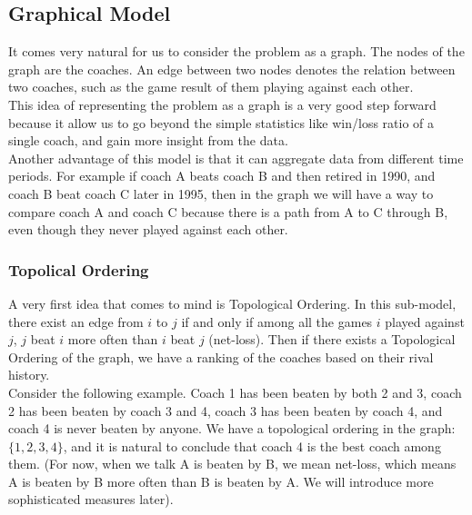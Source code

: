 \documentclass[titlepage]{article}
\begin{document}
\subsection{Graphical Model}
It comes very natural for us to consider the problem as a graph. The nodes of the graph are the coaches. An edge between two nodes denotes the relation between two coaches, such as the game result of them playing against each other.
\\

\noindent This idea of representing the problem as a graph is a very good step forward because it allow us to go beyond the simple statistics like win/loss ratio of a single coach, and gain more insight from the data.
\\

\noindent Another advantage of this model is that it can aggregate data from different time periods. For example if coach A beats coach B and then retired in 1990, and coach B beat coach C later in 1995, then in the graph we will have a way to compare coach A and coach C because there is a path from A to C through B, even though they never played against each other.

\subsubsection{Topolical Ordering}
A very first idea that comes to mind is Topological Ordering. In this sub-model, there exist an edge from $i$ to $j$ if and only if among all the games $i$ played against $j$, $j$ beat $i$ more often than $i$ beat $j$ (net-loss). Then if there exists a Topological Ordering of the graph, we have a ranking of the coaches based on their rival history.
\\

\noindent Consider the following example. Coach 1 has been beaten by both 2 and 3, coach 2 has been beaten by coach 3 and 4, coach 3 has been beaten by coach 4, and coach 4 is never beaten by anyone. We have a topological ordering in the graph: $\{1, 2, 3, 4\}$, and it is natural to conclude that coach 4 is the best coach among them. (For now, when we talk A is beaten by B, we mean net-loss, which means A is beaten by B more often than B is beaten by A. We will introduce more sophisticated measures later).
\end{document}
